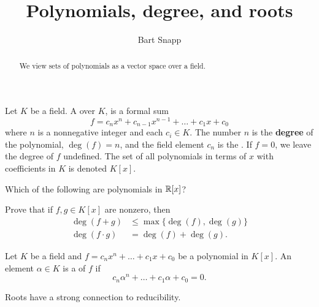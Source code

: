 \documentclass{ximera}
\author{Bart Snapp}
\title{Polynomials, degree, and roots}
\begin{document}
\begin{abstract}
  We view sets of polynomials as a vector space over a field.
\end{abstract}
\maketitle


\begin{definition}
  Let $K$ be a field. A  over $K$, is a formal sum
  \[
  f = c_nx^n + c_{n-1}x^{n-1} + \dots + c_1 x + c_0
  \]
  where $n$ is a nonnegative integer and each $c_i \in K$. The number
  $n$ is the \textbf{degree} of the polynomial, $\deg(f) = n$, and the
  field element $c_n$ is the . If $f=0$, we
  leave the degree of $f$ undefined. The set of all polynomials in
  terms of $x$ with coefficients in $K$ is denoted $K[x]$.
\end{definition}

\begin{exercise} 
  Which of the following are polynomials in $\mathbb R[x]$?
  \begin{selectAll}
  \end{selectAll}
\end{exercise}


\begin{exercise}
  Prove that if $f,g\in K[x]$ are nonzero, then
  \begin{align*}
    \deg(f+g) &\le \max\{\deg(f),\deg(g)\}\\
    \deg(f\cdot g) &= \deg(f) + \deg(g).
  \end{align*}
\end{exercise}



\begin{definition}
  Let $K$ be a field and $f= c_nx^n + \dots + c_1 x+ c_0$ be a
  polynomial in $K[x]$. An element $\alpha\in K$ is a  of
  $f$ if
  \[
  c_n\alpha^n + \dots + c_1 \alpha+ c_0 =0.
  \]
\end{definition}


Roots have a strong connection to reducibility.
\end{document}
